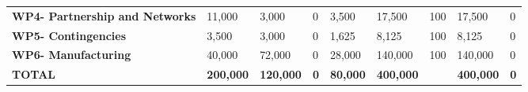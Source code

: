 \begin{landscape}
\begin{table}[H]
{\begin{tabular}{p{5cm}p{2cm}p{2cm}p{2.5cm}p{2cm}p{2cm}p{2cm}p{2cm}p{2cm}}
    \textbf{WP4- Partnership and Networks} & 11,000                                                                 & 3,000                                                              & 0                                                                               & 3,500                                                                        & 17,500                                                                                        & 100                          & 17,500                          & 0                                                                         \\
    \textbf{WP5- Contingencies}                                                        & 3,500                                                                  & 3,000                                                              & 0                                                                               & 1,625                                                                        & 8,125                                                                                         & 100                          & 8,125                           & 0                                                                         \\
    \textbf{WP6- Manufacturing}                                                        & 40,000                                                                 & 72,000                                                             & 0                                                                               & 28,000                                                                       & 140,000                                                                                       & 100                          & 140,000                         & 0                                                                         \\ \hline
    \textbf{TOTAL}                                                                     & \textbf{200,000}                                                       & \textbf{120,000}                                                   & \textbf{0}                                                                      & \textbf{80,000}                                                              & \textbf{400,000}                                                                              & \textbf{}                    & \textbf{400,000}                & \textbf{0}                                                               
    \\ \bottomrule[2pt]
    \end{tabular} }
    \end{table}


\end{landscape}
